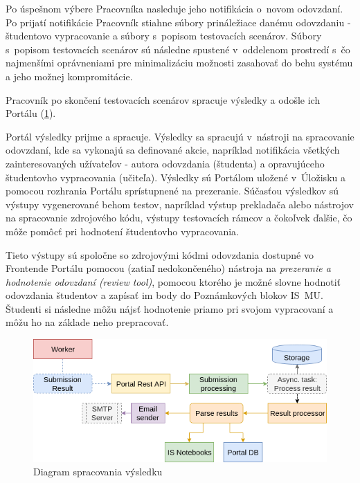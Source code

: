 \documentclass[
  digital, %
  oneside, %
  table,   %
  lof,     %
  lot,   %
]{fithesis3}
\begin{document}
Po úspešnom výbere Pracovníka nasleduje jeho notifikácia o~novom odovzdaní. Po prijatí notifikácie Pracovník stiahne súbory prináležiace danému odovzdaniu - študentovo vypracovanie a súbory s~popisom testovacích scenárov. Súbory s~popisom testovacích scenárov sú následne spustené v~oddelenom prostredí s~čo najmenšími oprávneniami pre minimalizáciu možnosti zasahovať do behu systému a jeho možnej kompromitácie.

Pracovník po skončení testovacích scenárov spracuje výsledky a odošle ich Portálu (\ref{fig:proc-result}).

Portál výsledky prijme a spracuje. Výsledky sa spracujú v~nástroji na spracovanie odovzdaní, kde sa vykonajú sa definované akcie, napríklad notifikácia všetkých zainteresovaných užívateľov - autora odovzdania (študenta) a opravujúceho študentovho vypracovania (učiteľa). Výsledky sú Portálom uložené v~Úložisku a pomocou rozhrania Portálu sprístupnené na prezeranie. Súčasťou výsledkov sú výstupy vygenerované behom testov, napríklad výstup prekladača alebo nástrojov na spracovanie zdrojového kódu, výstupy testovacích rámcov a čokoľvek ďalšie, čo môže pomôcť pri hodnotení študentovho vypracovania.

Tieto výstupy sú spoločne so zdrojovými kódmi odovzdania dostupné vo Frontende Portálu pomocou (zatiaľ nedokončeného) nástroja na \emph{prezeranie a hodnotenie odovzdaní (review tool)}, pomocou ktorého je možné slovne hodnotiť odovzdania študentov a zapísať im body do Poznámkových blokov IS~MU. Študenti si následne môžu nájsť hodnotenie priamo pri svojom vypracovaní a môžu ho na základe neho prepracovať. 

\begin{figure}[!ht]
  \begin{center}
    \includegraphics[width=\textwidth]{imgs/process-result.png}
  \end{center}
    \caption{Diagram spracovania výsledku}
    \label{fig:proc-result}
\end{figure}
\end{document}
